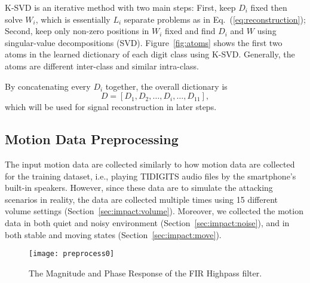 K-SVD is an iterative method with two main steps: First, keep $D_i$ fixed then solve $W_i$, which is essentially $L_i$ separate problems as in Eq.~(\ref{eq:reconstruction}); Second, keep only non-zero positions in $W_i$ fixed and find $D_i$ and $W$ using singular-value decompositions (SVD). Figure~\ref{fig:atoms} shows the first two atoms in the learned dictionary of each digit class using K-SVD. Generally, the atoms are different inter-class and similar intra-class.

By concatenating every $D_i$ together, the overall dictionary is 
\begin{equation}
	D = \left[ D_1, D_2, \ldots, D_i, \ldots, D_{11} \right], \label{eq:dictConcat}
\end{equation}
which will be used for signal reconstruction in later steps.





\subsection{Motion Data Preprocessing}
The input motion data are collected similarly to how motion data are collected for the training dataset, i.e., playing TIDIGITS audio files by the smartphone's built-in speakers. However, since these data are to simulate the attacking scenarios in reality, the data are collected multiple times using 15 different volume settings (Section~\ref{sec:impact:volume}). Moreover, we collected the motion data in both quiet and noisy environment (Section~\ref{sec:impact:noise}), and in both stable and moving states (Section~\ref{sec:impact:move}).
\begin{figure*}[!h]
	\centering
	\texttt{[image: preprocess0]}
	\caption{The Magnitude and Phase Response of the FIR Highpass filter.}\label{fig:spyphoneresponse}
\end{figure*}


